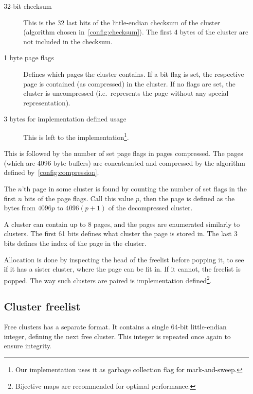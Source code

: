\documentclass[11pt,a4paper]{report}
\newcommand{\pagesize}{4096 }
\begin{document}
        \begin{description}
            \item [32-bit checksum] This is the 32 last bits of the
                little-endian checksum of the cluster (algorithm
                chosen in~\ref{config:checksum}). The first 4 bytes of
                the cluster are not included in the checksum.
            \item [1 byte page flags] Defines which pages the cluster contains.
                If a bit flag is set, the respective page is contained (as
                compressed) in the cluster. If no flags are set, the cluster is
                uncompressed (i.e.\ represents the page without any special
                representation).
            \item [3 bytes for implementation defined usage] This is
                left to the implementation\footnote{Our implementation
                uses it as garbage collection flag for mark-and-sweep.}.
        \end{description}

        This is followed by the number of set page flags in pages compressed.
        The pages (which are \pagesize byte buffers) are concatenated and
        compressed by the algorithm defined by~\ref{config:compression}.

        The $n$'th page in some cluster is found by counting the number of set
        flags in the first $n$ bits of the page flags. Call this value $p$,
        then the page is defined as the bytes from $\pagesize p$ to $\pagesize
        (p + 1)$ of the decompressed cluster.

        A cluster can contain up to 8 pages, and the pages are enumerated
        similarly to clusters. The first 61 bits defines what cluster the page
        is stored in. The last 3 bits defines the index of the page in the
        cluster.

        Allocation is done by inspecting the head of the freelist before
        popping it, to see if it has a sister cluster, where the page can be
        fit in. If it cannot, the freelist is popped. The way such clusters are
        paired is implementation defined\footnote{Bijective maps are
        recommended for optimal performance.}.

        \subsection{Cluster freelist}
        \label{cluster:freelist}
        Free clusters has a separate format. It contains a single 64-bit
        little-endian integer, defining the next free cluster. This integer is
        repeated once again to ensure integrity.
\end{document}
